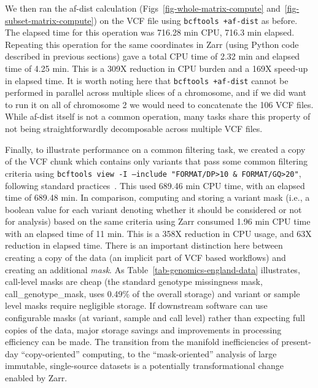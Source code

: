 \documentclass[a4paper,num-refs]{oup-contemporary}
\begin{document}
We then ran the af-dist calculation (Figs~\ref{fig-whole-matrix-compute}
and~\ref{fig-subset-matrix-compute}) on the VCF file
using \texttt{bcftools +af-dist} as before. 
The elapsed time for this operation was 716.28 min CPU, 716.3 min elapsed.
Repeating this operation for the same coordinates in Zarr 
(using Python code described in previous sections) 
gave a total CPU time of 2.32 min and elapsed time of 4.25 min.
This is a 309X reduction in CPU burden and a 169X speed-up in elapsed time.
It is worth noting here that \texttt{bcftools +af-dist} cannot be 
performed in parallel across multiple slices of a chromosome, and if 
we did want to run it on all of chromosome 2 we would need to 
concatenate the 106 VCF files. While af-dist itself is not a common operation,
many tasks share this property
of not being straightforwardly decomposable across multiple VCF files.

Finally, to illustrate performance on a common filtering task, we 
created a copy of the VCF chunk which contains only variants 
that pass some common filtering criteria using
\texttt{bcftools view -I --include "FORMAT/DP>10 \& FORMAT/GQ>20"},
following standard practices~\citep[e.g.][]{bergstrom2020insights,
kousathanas2022whole,
chen2024genomic}.
This used 689.46 min CPU time, with an elapsed time of 689.48 min.
In comparison, computing and storing a variant mask (i.e., a boolean value 
for each variant denoting whether it should be considered or not
for analysis) based on the same criteria using Zarr 
consumed 1.96 min CPU time with an elapsed time of 11 min.
This is a 358X reduction in CPU usage, and 63X reduction in elapsed time.
There is an important distinction here between creating a copy
of the data (an implicit part of VCF based workflows) and creating an
additional \emph{mask}. As Table~\ref{tab-genomics-england-data} 
illustrates, call-level masks are cheap (the standard 
genotype missingness mask, call\_genotype\_mask, uses 0.49\% of the overall 
storage) and variant or sample level masks require negligible storage.
If downstream software can 
use configurable masks (at variant, sample and call level) 
rather than expecting full copies of the data, major storage savings
and improvements in processing efficiency can be made.
The transition from the manifold inefficiencies of 
present-day ``copy-oriented'' computing,
to the ``mask-oriented'' analysis of large immutable, single-source
datasets is a potentially transformational change enabled by Zarr.
\end{document}
